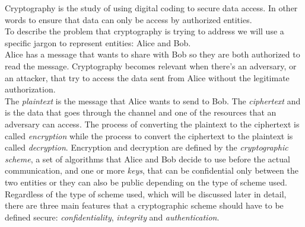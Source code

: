 Cryptography is the study of using digital coding to secure data access. In other words to ensure that data can only be access by authorized entities.\\
To describe the problem that cryptography is trying to address we will use a specific jargon to represent entities: Alice and Bob.\\
Alice has a message that wants to share with Bob so they are both authorized to read the message. Cryptography becomes relevant when there's an adversary, or an attacker, that try to access the data sent from Alice without the legitimate authorization.\\
The \emph{plaintext} is the message that Alice wants to send to Bob. The \emph{ciphertext} and is the data that goes through the channel and one of the resources that an adversary can access.
The process of converting the plaintext to the ciphertext is called \emph{encryption} while the process to convert the ciphertext to the plaintext is called \emph{decryption}.
Encryption and decryption are defined by the \emph{cryptographic scheme}, a set of algorithms that Alice and Bob decide to use before the actual communication, and one or more \emph{keys}, that can be confidential only between the two entities or they can also be public depending on the type of scheme used.\\
Regardless of the type of scheme used, which will be discussed later in detail, there are three main features that a cryptographic scheme should have to be defined secure: \emph{confidentiality}, \emph{integrity} and \emph{authentication}.
